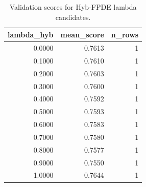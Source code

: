 \begin{table}[t]
\caption{Validation scores for Hyb-FPDE lambda candidates.}
\label{tab:lambda_distribution_computed}
\centering
\begin{tabular}{rrr}
\toprule
lambda\_hyb & mean\_score & n\_rows \\
\midrule
0.0000 & 0.7613 & 1 \\
0.1000 & 0.7610 & 1 \\
0.2000 & 0.7603 & 1 \\
0.3000 & 0.7600 & 1 \\
0.4000 & 0.7592 & 1 \\
0.5000 & 0.7593 & 1 \\
0.6000 & 0.7583 & 1 \\
0.7000 & 0.7580 & 1 \\
0.8000 & 0.7577 & 1 \\
0.9000 & 0.7550 & 1 \\
1.0000 & 0.7644 & 1 \\
\bottomrule
\end{tabular}

\end{table}
